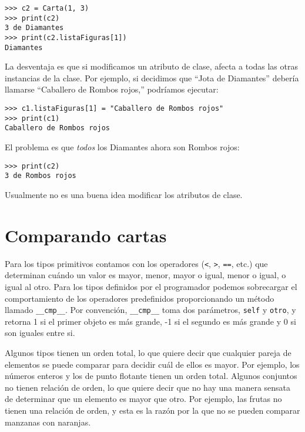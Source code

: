 \begin{lstlisting}
>>> c2 = Carta(1, 3)
>>> print(c2)
3 de Diamantes
>>> print(c2.listaFiguras[1])
Diamantes
\end{lstlisting}
 La desventaja es que si modificamos un atributo de clase, afecta
a todas las otras instancias de la clase. Por ejemplo, si decidimos
que ``Jota de Diamantes'' debería llamarse ``Caballero de Rombos
rojos,'' podríamos ejecutar:

 

\begin{lstlisting}
>>> c1.listaFiguras[1] = "Caballero de Rombos rojos"
>>> print(c1)
Caballero de Rombos rojos
\end{lstlisting}
 El problema es que {\em todos} los Diamantes ahora son Rombos
rojos:

\begin{lstlisting}
>>> print(c2)
3 de Rombos rojos
\end{lstlisting}
 Usualmente no es una buena idea modificar los atributos de clase.

\section{Comparando cartas}

\label{comparecard}  

Para los tipos primitivos contamos con los operadores (\texttt{<},
\texttt{>}, \texttt{==}, etc.) que determinan cuándo un valor es mayor,
menor, mayor o igual, menor o igual, o igual al otro. Para los tipos
definidos por el programador podemos sobrecargar el comportamiento
de los operadores predefinidos proporcionando un método llamado \texttt{\_\_cmp\_\_}.
Por convención, \texttt{\_\_cmp\_\_} toma dos parámetros, \texttt{self}
y \texttt{otro}, y retorna 1 si el primer objeto es más grande, -1
si el segundo es más grande y 0 si son iguales entre si.

  
 

Algunos tipos tienen un orden total, lo que quiere decir que cualquier
pareja de elementos se puede comparar para decidir cuál de ellos es
mayor. Por ejemplo, los números enteros y los de punto flotante tienen
un orden total. Algunos conjuntos no tienen relación de orden, lo
que quiere decir que no hay una manera sensata de determinar que un
elemento es mayor que otro. Por ejemplo, las frutas no tienen una
relación de orden, y esta es la razón por la que no se pueden comparar
manzanas con naranjas.

